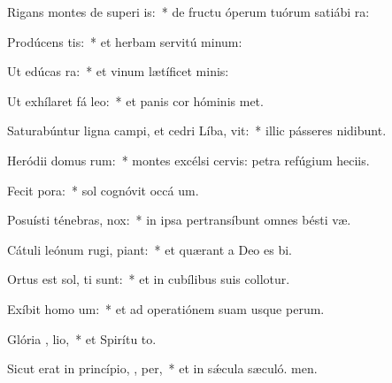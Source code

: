 \item Rigans montes de superi is:~* de fructu óperum tuórum satiábi ra:
\item Prodúcens  tis:~* et herbam servitú minum:
\item Ut edúcas   ra:~* et vinum lætíficet  minis:
\item Ut exhílaret fá  leo:~* et panis cor hóminis met.
\item Saturabúntur ligna campi, et cedri Líba,  vit:~* illic pásseres nidibunt.
\item Heródii domus   rum:~* montes excélsi cervis: petra refúgium heciis.
\item Fecit   pora:~* sol cognóvit occá um.
\item Posuísti ténebras,    nox:~* in ipsa pertransíbunt omnes bésti væ.
\item Cátuli leónum rugi,  piant:~* et quærant a Deo es bi.
\item Ortus est sol,  ti sunt:~* et in cubílibus suis collotur.
\item Exíbit homo   um:~* et ad operatiónem suam usque  perum.
\item Glória ,  lio,~* et Spirítu to.
\item Sicut erat in princípio,  ,  per,~* et in sǽcula sæculó. men.

